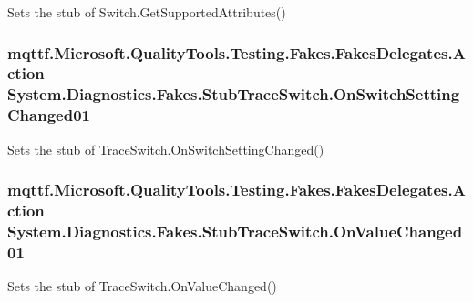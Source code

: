 Sets the stub of Switch.\-Get\-Supported\-Attributes()

\hypertarget{class_system_1_1_diagnostics_1_1_fakes_1_1_stub_trace_switch_ab141e548404e7289e143a2d78ba4c782}{
\subsubsection[{On\-Switch\-Setting\-Changed01}]{\setlength{\rightskip}{0pt plus 5cm}mqttf.\-Microsoft.\-Quality\-Tools.\-Testing.\-Fakes.\-Fakes\-Delegates.\-Action System.\-Diagnostics.\-Fakes.\-Stub\-Trace\-Switch.\-On\-Switch\-Setting\-Changed01}}\label{class_system_1_1_diagnostics_1_1_fakes_1_1_stub_trace_switch_ab141e548404e7289e143a2d78ba4c782}


Sets the stub of Trace\-Switch.\-On\-Switch\-Setting\-Changed()

\hypertarget{class_system_1_1_diagnostics_1_1_fakes_1_1_stub_trace_switch_a08faf212995eb887f0f43a3d493bcf0c}{
\subsubsection[{On\-Value\-Changed01}]{\setlength{\rightskip}{0pt plus 5cm}mqttf.\-Microsoft.\-Quality\-Tools.\-Testing.\-Fakes.\-Fakes\-Delegates.\-Action System.\-Diagnostics.\-Fakes.\-Stub\-Trace\-Switch.\-On\-Value\-Changed01}}\label{class_system_1_1_diagnostics_1_1_fakes_1_1_stub_trace_switch_a08faf212995eb887f0f43a3d493bcf0c}


Sets the stub of Trace\-Switch.\-On\-Value\-Changed()



